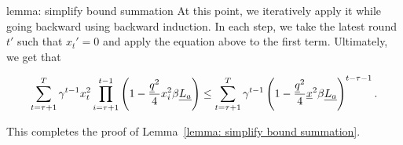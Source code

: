 \begin{proofof}{lemma: simplify bound summation}
At this point, we iteratively apply it while going backward using backward induction. In each step, we take the latest round $t'$ such that $x_t' = 0$ and apply the equation above to the first term. Ultimately, we get that

\begin{align*}
\sum_{t = \tau + 1}^T \gamma^{t-1} x_t^2 \prod_{i = \tau + 1}^{t-1} \left( 1 - \frac{\underline{q} ^2}{4} x_i^2 \beta \underline{L_a} \right) \leq \sum_{t = \tau + 1}^{T} \gamma^{t-1} \left( 1 - \frac{\underline{q} ^2}{4} \underline{x}^2 \beta \underline{L_a} \right)^{t - \tau - 1}.
\end{align*}

This completes the proof of Lemma~\ref{lemma: simplify bound summation}.
\end{proofof}